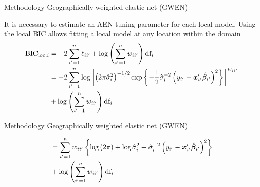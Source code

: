 \documentclass[12pt,t,handout]{beamer}
\newcommand{\subt}[1]{{\footnotesize \color{subtitle} {#1}}}
\begin{document}
\begin{frame}{Methodology}
\subt{Geographically weighted elastic net (GWEN)}

\bigskip
It is necessary to estimate an AEN tuning parameter for each local model. Using the local BIC allows fitting a local model at any location within the domain
	\begin{align}\label{eq:BIC_loc}
		\mbox{BIC}_{\text{loc}, i} &= -2 \sum_{i'=1}^n \ell_{ii'}  + \log \left( \sum_{i'=1}^n w_{ii'} \right) \mbox{df}_i\notag\\
		&= -2 \sum_{i'=1}^n \log \left[ \left(2 \pi \hat{\sigma}_i^2\right)^{-1/2} \exp \left\{-\frac{1}{2} \hat{\sigma}_i^{-2} \left(y_{i'} - \bm{x}_{i'}' \hat{\bm{\beta}}_{i'} \right)^2\right\} \right]^{w_{ii'}} \notag \\
		&+ \log \left( \sum_{i'=1}^n w_{ii'} \right) \mbox{df}_i\notag\\
	\end{align}


\end{frame}







\begin{frame}{Methodology}
\subt{Geographically weighted elastic net (GWEN)}

\bigskip
	\begin{align}
		&= \sum_{i'=1}^n w_{ii'} \left\{ \log \left(2 \pi \right) + \log \hat{\sigma}_i^2 + \hat{\sigma}_i^{-2} \left(y_{i'} - \bm{x}_{i'}' \hat{\bm{\beta}}_{i'} \right)^2 \right\} \notag \\
		&+ \log \left( \sum_{i'=1}^n w_{ii'} \right) \mbox{df}_i \notag
	\end{align}


\end{frame}
\end{document}
